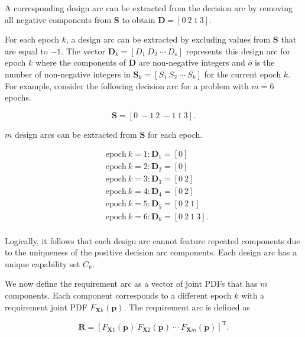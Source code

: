 A corresponding design arc can be extracted from the decision arc by removing all negative components from $\mathbf{S}$ to obtain $\mathbf{D} = \left[0 ~ 2 ~ 1 ~ 3\right]$. 

For each epoch $k$, a design arc can be extracted by excluding values from $\mathbf{S}$ that are equal to $-1$. The vector $\mathbf{D}_k = \left[D_1 ~ D_2 ~ \cdots ~ D_o\right]$ represents this design arc for epoch $k$ where the components of $\mathbf{D}$ are non-negative integers and $o$ is the number of non-negative integers in $\mathbf{S}_k = \left[S_1 ~ S_2 ~ \cdots ~ S_k\right]$ for the current epoch $k$. For example, consider the following decision arc for a problem with $m=6$ epochs.

\begin{equation*} \label{eq:decisionarcex}
	\mathbf{S} = \left[0 ~ -1 ~ 2 ~ -1 ~ 1 ~ 3\right].
\end{equation*}

$m$ design arcs can be extracted from $\mathbf{S}$ for each epoch.

\begin{equation*}
	\begin{aligned}
		& \mathrm{epoch~} k=1: \mathbf{D}_1 = \left[0\right]\\
		& \mathrm{epoch~} k=2: \mathbf{D}_2 = \left[0\right]\\
		& \mathrm{epoch~} k=3: \mathbf{D}_3 = \left[0 ~ 2\right]\\
		& \mathrm{epoch~} k=4: \mathbf{D}_4 = \left[0 ~ 2\right]\\
		& \mathrm{epoch~} k=5: \mathbf{D}_5 = \left[0 ~ 2 ~ 1\right]\\
		& \mathrm{epoch~} k=6: \mathbf{D}_6 = \left[0 ~ 2 ~ 1 ~ 3\right].\\
	\end{aligned}
\end{equation*}

Logically, it follows that each design arc cannot feature repeated components due to the uniqueness of the positive decision arc components. Each design arc has a unique capability set $C_k$.

We now define the requirement arc as a vector of joint \acp{PDF} that has $m$ components. Each component corresponds to a different epoch $k$ with a requirement joint \ac{PDF} $F_{\mathbf{X}k}(\mathbf{p})$. The requirement arc is defined as

\begin{equation} \label{eq:requirementarc}
	\mathbf{R} = \left[F_{\mathbf{X}1}(\mathbf{p}) ~ F_{\mathbf{X}2}(\mathbf{p}) ~ \cdots ~ F_{\mathbf{X}m}(\mathbf{p})\right]^{\mathrm{T}}.
\end{equation}

